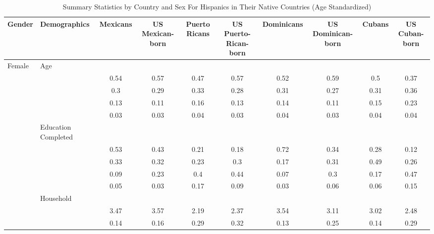 \documentclass[
]{article}
\begin{document}
\begin{landscape}

\begin{table}[ht]
\centering
\caption{Summary Statistics by Country and Sex For Hispanics in Their Native Countries (Age Standardized)} 
\begingroup\small
\begin{tabular}{l>{\raggedright\arraybackslash}p{3.2cm}|cccccccc}
  \hline
Gender & Demographics & Mexicans & US Mexican-born & Puerto Ricans & US Puerto-Rican-born & Dominicans & US Dominican-born & Cubans & US Cuban-born \\ 
  \hline
Female & Age &  &  &  &  &  &  &  &  \\ 
   & \multicolumn{1}{>{\raggedleft\arraybackslash}p{1.5cm}|}{\makebox[1.5cm][r]{60 - 69 }} & 0.54 & 0.57 & 0.47 & 0.57 & 0.52 & 0.59 & 0.5 & 0.37 \\ 
   & \multicolumn{1}{>{\raggedleft\arraybackslash}p{1.5cm}|}{\makebox[1.5cm][r]{70 - 79 }} & 0.3 & 0.29 & 0.33 & 0.28 & 0.31 & 0.27 & 0.31 & 0.36 \\ 
   & \multicolumn{1}{>{\raggedleft\arraybackslash}p{1.5cm}|}{\makebox[1.5cm][r]{80 - 89 }} & 0.13 & 0.11 & 0.16 & 0.13 & 0.14 & 0.11 & 0.15 & 0.23 \\ 
   & \multicolumn{1}{>{\raggedleft\arraybackslash}p{1.5cm}|}{\makebox[1.5cm][r]{90 plus }} & 0.03 & 0.03 & 0.04 & 0.03 & 0.04 & 0.03 & 0.04 & 0.04 \\ 
   & Education Completed &  &  &  &  &  &  &  &  \\ 
   & \multicolumn{1}{>{\raggedleft\arraybackslash}p{3.2cm}|}{\makebox[3.2cm][r]{Less than Primary }} & 0.53 & 0.43 & 0.21 & 0.18 & 0.72 & 0.34 & 0.28 & 0.12 \\ 
   & \multicolumn{1}{>{\raggedleft\arraybackslash}p{1.7cm}|}{\makebox[1.7cm][r]{Primary }} & 0.33 & 0.32 & 0.23 & 0.3 & 0.17 & 0.31 & 0.49 & 0.26 \\ 
   & \multicolumn{1}{>{\raggedleft\arraybackslash}p{2cm}|}{\makebox[2cm][r]{Secondary }} & 0.09 & 0.23 & 0.4 & 0.44 & 0.07 & 0.3 & 0.17 & 0.47 \\ 
   & \multicolumn{1}{>{\raggedleft\arraybackslash}p{2cm}|}{\makebox[2cm][r]{University }} & 0.05 & 0.03 & 0.17 & 0.09 & 0.03 & 0.06 & 0.06 & 0.15 \\ 
   & Household &  &  &  &  &  &  &  &  \\ 
   & \multicolumn{1}{>{\raggedleft\arraybackslash}p{2.7cm}|}{\makebox[2.7cm][r]{Household Size }} & 3.47 & 3.57 & 2.19 & 2.37 & 3.54 & 3.11 & 3.02 & 2.48 \\ 
   & \multicolumn{1}{>{\raggedleft\arraybackslash}p{2.2cm}|}{\makebox[2.2cm][r]{Lives Alone }} & 0.14 & 0.16 & 0.29 & 0.32 & 0.13 & 0.25 & 0.14 & 0.29 \\ 

\end{tabular}
\end{table}
\end{landscape}
\end{document}
